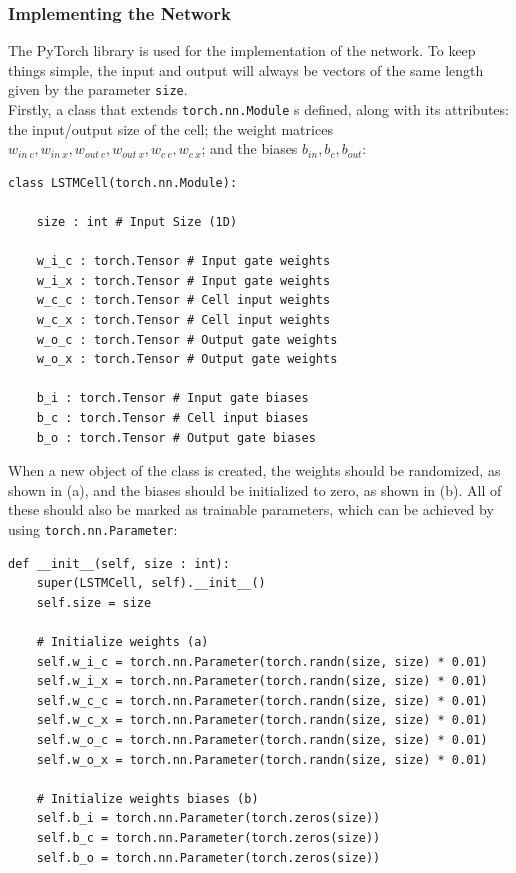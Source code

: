 \documentclass[twoside,a4paper,10pt,DIV=12,BCOR=12mm]{scrartcl}
\begin{document}
\subsubsection{Implementing the Network}
The PyTorch library is used for the implementation of the network. To keep things simple, the input and output will always be vectors of the same length given by the parameter \lstinline{size}.\\
Firstly, a class that extends \lstinline{torch.nn.Module} s defined, along with its attributes: the input/output size of the cell; the weight matrices \begin{math}w_{in\ c},w_{in\ x},w_{out\ c},w_{out\ x},w_{c\ c},w_{c\ x}\end{math}; and the biases \begin{math}b_{in},b_c,b_{out}\end{math}:\cite{keras-lstm,pytorch-lstm}
\begin{lstlisting}
class LSTMCell(torch.nn.Module):
    
    size : int # Input Size (1D)
    
    w_i_c : torch.Tensor # Input gate weights
    w_i_x : torch.Tensor # Input gate weights
    w_c_c : torch.Tensor # Cell input weights
    w_c_x : torch.Tensor # Cell input weights
    w_o_c : torch.Tensor # Output gate weights
    w_o_x : torch.Tensor # Output gate weights
    
    b_i : torch.Tensor # Input gate biases
    b_c : torch.Tensor # Cell input biases
    b_o : torch.Tensor # Output gate biases
\end{lstlisting}
When a new object of the class is created, the weights should be randomized, as shown in (a), and the biases should be initialized to zero, as shown in (b). All of these should also be marked as trainable parameters, which can be achieved by using \lstinline{torch.nn.Parameter}:\cite{keras-lstm,pytorch-lstm}
\begin{lstlisting}
def __init__(self, size : int):
    super(LSTMCell, self).__init__()
    self.size = size
    
    # Initialize weights (a)
    self.w_i_c = torch.nn.Parameter(torch.randn(size, size) * 0.01)
    self.w_i_x = torch.nn.Parameter(torch.randn(size, size) * 0.01)
    self.w_c_c = torch.nn.Parameter(torch.randn(size, size) * 0.01)
    self.w_c_x = torch.nn.Parameter(torch.randn(size, size) * 0.01)
    self.w_o_c = torch.nn.Parameter(torch.randn(size, size) * 0.01)
    self.w_o_x = torch.nn.Parameter(torch.randn(size, size) * 0.01)
    
    # Initialize weights biases (b)
    self.b_i = torch.nn.Parameter(torch.zeros(size))
    self.b_c = torch.nn.Parameter(torch.zeros(size))
    self.b_o = torch.nn.Parameter(torch.zeros(size))   
\end{lstlisting}
\end{document}
